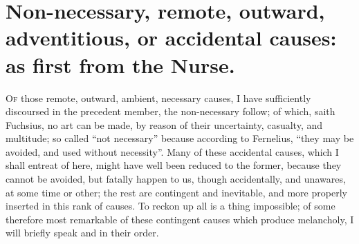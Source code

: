 \section[Remote or accidental causes]{Non-necessary, remote, outward,
adventitious, or accidental causes: as first from the Nurse.}

\lettrine{O}{f} those remote, outward, ambient, necessary causes, I have
sufficiently discoursed in the precedent member, the non-necessary follow; of
which, saith Fuchsius, no art can be made, by reason of
their uncertainty, casualty, and multitude; so called \enquote{not necessary} because
according to Fernelius, \enquote{they may be avoided, and used
without necessity}. Many of these accidental causes, which I shall entreat of
here, might have well been reduced to the former, because they cannot be
avoided, but fatally happen to us, though accidentally, and unawares, at some
time or other; the rest are contingent and inevitable, and more properly
inserted in this rank of causes. To reckon up all is a thing impossible; of
some therefore most remarkable of these contingent causes which produce
melancholy, I will briefly speak and in their order.


